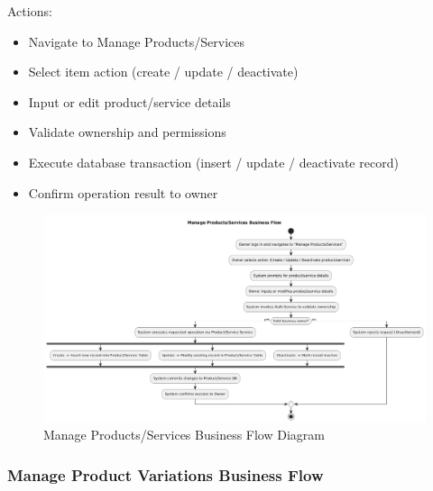 \documentclass[]{VUMIFTemplateClass}
\begin{document}
Actions:
\begin{itemize}
\setlength{\itemsep}{2pt}
\setlength{\parskip}{0pt}
\setlength{\parsep}{0pt}
\item Navigate to Manage Products/Services
\item Select item action (create / update / deactivate)
\item Input or edit product/service details
\item Validate ownership and permissions
\item Execute database transaction (insert / update / deactivate record)
\item Confirm operation result to owner
\end{itemize}

\begin{figure}[H]
    \centering
    \includegraphics[width=1\textwidth]{docs/ps-design/design-document/diagrams/business/bpmn_products_services.png}
    \caption{Manage Products/Services Business Flow Diagram}
    \label{fig:product_service_manage_flow}
\end{figure}

\subsubsection{Manage Product Variations Business Flow}
\end{document}
